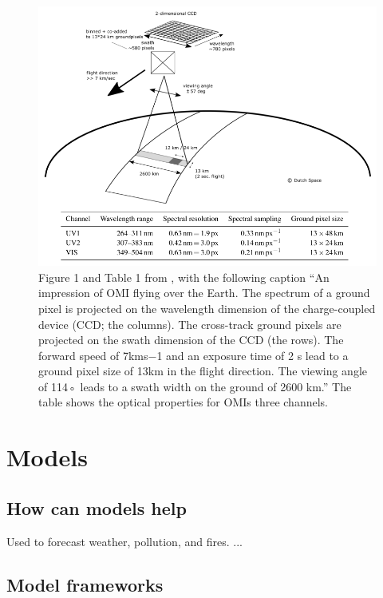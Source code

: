     \begin{figure}
      \includegraphics[width=\textwidth]{Figures/Shenkeveld_OMI_summary.png}
      \caption{ %
        Figure 1 and Table 1 from \cite{Schenkeveld2017}, with the following caption ``An impression of OMI flying over the Earth. The spectrum of a ground pixel is projected on the wavelength dimension of the charge-coupled device (CCD; the columns). The cross-track ground pixels are projected on the swath dimension of the CCD (the rows). The forward speed of 7kms−1 and an exposure time of 2 s lead to a ground pixel size of 13km in the flight direction. The viewing angle of 114◦ leads to a swath width on the ground of 2600 km.''
        The table shows the optical properties for OMIs three channels.}
      \label{LR:fig:Shenkeveld_OMI_summary}
    \end{figure}
    
\section{Models}
  
  \subsection{How can models help}
    Used to forecast weather, pollution, and fires. ...
    
  \subsection{Model frameworks}
    

